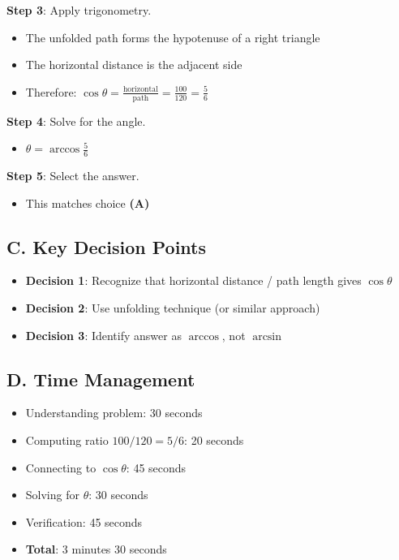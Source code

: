 \documentclass[11pt]{article}
\begin{document}
\begin{roadmapbox}
\textbf{Step 3}: Apply trigonometry.
\begin{itemize}
    \item The unfolded path forms the hypotenuse of a right triangle
    \item The horizontal distance is the adjacent side
    \item Therefore: $\cos\theta = \frac{\text{horizontal}}{\text{path}} = \frac{100}{120} = \frac{5}{6}$
\end{itemize}

\textbf{Step 4}: Solve for the angle.
\begin{itemize}
    \item $\theta = \arccos\frac{5}{6}$
\end{itemize}

\textbf{Step 5}: Select the answer.
\begin{itemize}
    \item This matches choice \textbf{(A)}
\end{itemize}

\subsection*{C. Key Decision Points}
\begin{itemize}[leftmargin=*]
    \item \textbf{Decision 1}: Recognize that horizontal distance / path length gives $\cos\theta$
    \item \textbf{Decision 2}: Use unfolding technique (or similar approach)
    \item \textbf{Decision 3}: Identify answer as $\arccos$, not $\arcsin$
\end{itemize}

\subsection*{D. Time Management}
\begin{itemize}[leftmargin=*]
    \item Understanding problem: 30 seconds
    \item Computing ratio $100/120 = 5/6$: 20 seconds
    \item Connecting to $\cos\theta$: 45 seconds
    \item Solving for $\theta$: 30 seconds
    \item Verification: 45 seconds
    \item \textbf{Total}: 3 minutes 30 seconds
\end{itemize}
\end{roadmapbox}
\end{document}
